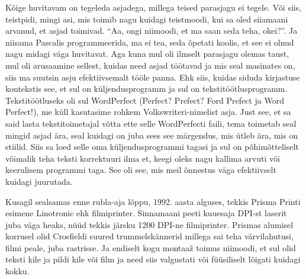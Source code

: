 
Kõige huvitavam on tegeleda asjadega, millega teised parasjagu ei tegele. Või 
siis, teistpidi, mingi asi, mis toimib nagu kuidagi teistmoodi, kui sa oled 
siiamaani arvanud, et asjad toimivad. \enquote{Aa, ongi niimoodi, et ma saan 
seda teha, okei?}. Ja niisama Pascalis programmeerida, ma ei tea, seda õpetati 
koolis, et see ei olnud nagu midagi väga huvitavat. Aga kuna mul oli ilmselt  
parasjagu olemas taust, mul oli arusaamine sellest, kuidas need asjad töötavad 
ja mis seal masinates on,  siis ma suutsin asju efektiivsemalt tööle panna. Ehk 
siis, kuidas siduda kirjastuse kontekstis see, et sul on  küljendusprogramm ja 
sul on tekstitöötlusprogramm. Tekstitöötluseks oli sul WordPerfect (Perfect? 
Prefect? Ford Prefect ja Word Perfect!),  me küll kasutasime rohkem Volkswriteri-nimelist 
asja. Just see, et sa said lasta tekstitoimetajal 
võtta ette selle WordPerfecti faili, tema toimetab seal mingid asjad ära, seal 
kuidagi on juba sees see märgendus, mis ütleb ära, mis on  stiilid. Siis sa 
loed selle oma küljendusprogrammi tagasi ja sul on põhimõtteliselt võimalik 
teha teksti korrektuuri ilma et,  keegi oleks nagu kallima arvuti või 
keerulisem programmi taga. See oli see, mis meil õnnestus väga efektiivselt 
kuidagi juurutada. 

Kusagil sealsamas enne rubla-aja lõppu, 1992. aasta alguses, tekkis Prisma 
Printi esimene Linotronic ehk filmiprinter. Sinnamaani 
peeti kuuesaja DPI-st laserit juba väga heaks, nüüd tekkis järsku 1200 DPI-ne 
filmiprinter. Prismas  alumisel korrusel olid Crosfieldi suured 
trummelskännerid millega sai 
teha värvilahutusi, filmi peale, juba rastrisse. Ja endiselt kogu montaaž 
toimus niimoodi, et sul olid teksti kile ja pildi kile või film ja need siis 
valgustati või füüsiliselt lõigati kuidagi kokku. 

